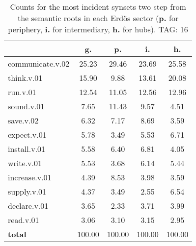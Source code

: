 \begin{table}[h!]
\begin{center}
\begin{tabular}{| l | c | c | c | c |}\hline
 & g. & p. & i. & h. \\\hline
communicate.v.02 & 25.23  & 29.46  & 23.69  & 25.58 \\\hline
think.v.01 & 15.90  & 9.88  & 13.61  & 20.08 \\\hline
run.v.01 & 12.54  & 11.05  & 12.56  & 12.96 \\\hline
sound.v.01 & 7.65  & 11.43  & 9.57  & 4.51 \\\hline
save.v.02 & 6.32  & 7.17  & 8.69  & 3.59 \\\hline
expect.v.01 & 5.78  & 3.49  & 5.53  & 6.71 \\\hline
install.v.01 & 5.58  & 6.40  & 6.81  & 4.05 \\\hline
write.v.01 & 5.53  & 3.68  & 6.14  & 5.44 \\\hline
increase.v.01 & 4.39  & 8.53  & 3.98  & 3.59 \\\hline
supply.v.01 & 4.37  & 3.49  & 2.55  & 6.54 \\\hline
declare.v.01 & 3.65  & 2.33  & 3.71  & 3.99 \\\hline
read.v.01 & 3.06  & 3.10  & 3.15  & 2.95 \\\hline
{{\bf total}} & 100.00  & 100.00  & 100.00  & 100.00 \\\hline
\end{tabular}
\caption{Counts for the most incident synsets two step from the semantic roots in each Erd\"os sector ({\bf p.} for periphery, {\bf i.} for intermediary, {\bf h.} for hubs). TAG: 16}
\end{center}
\end{table}